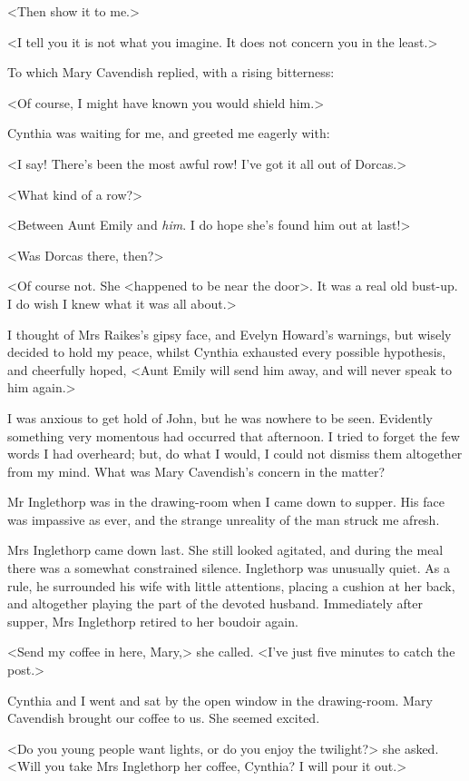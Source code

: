  <Then show it to me.> 

 <I tell you it is not what you imagine. It does not concern you in the least.> 

 To which Mary Cavendish replied, with a rising bitterness: 

 <Of course, I might have known you would shield him.> 

 Cynthia was waiting for me, and greeted me eagerly with: 

 <I say! There's been the most awful row! I've got it all out of Dorcas.> 

 <What kind of a row?> 

 <Between Aunt Emily and \emph{him}. I do hope she's found him out at last!> 

 <Was Dorcas there, then?> 

 <Of course not. She <happened to be near the door>. It was a real old bust-up. I do wish I knew what it was all about.> 

 I thought of Mrs Raikes's gipsy face, and Evelyn Howard's warnings, but wisely decided to hold my peace, whilst Cynthia exhausted every possible hypothesis, and cheerfully hoped, <Aunt Emily will send him away, and will never speak to him again.> 

 I was anxious to get hold of John, but he was nowhere to be seen. Evidently something very momentous had occurred that afternoon. I tried to forget the few words I had overheard; but, do what I would, I could not dismiss them altogether from my mind. What was Mary Cavendish's concern in the matter? 

 Mr Inglethorp was in the drawing-room when I came down to supper. His face was impassive as ever, and the strange unreality of the man struck me afresh. 

 Mrs Inglethorp came down last. She still looked agitated, and during the meal there was a somewhat constrained silence. Inglethorp was unusually quiet. As a rule, he surrounded his wife with little attentions, placing a cushion at her back, and altogether playing the part of the devoted husband. Immediately after supper, Mrs Inglethorp retired to her boudoir again. 

 <Send my coffee in here, Mary,> she called. <I've just five minutes to catch the post.> 

 Cynthia and I went and sat by the open window in the drawing-room. Mary Cavendish brought our coffee to us. She seemed excited. 

 <Do you young people want lights, or do you enjoy the twilight?> she asked. <Will you take Mrs Inglethorp her coffee, Cynthia? I will pour it out.> 

